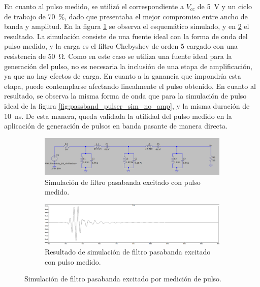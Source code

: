 En cuanto al pulso medido, se utilizó el correspondiente a $V_{cc}$ de
\qty{5}{\volt} y un ciclo de trabajo de \qty{70}{\percent}, dado que presentaba
el mejor compromiso entre ancho de banda y amplitud. En la figura
\ref{fig:passband_with_measurement} se observa el esquemático simulado, y en
\ref{fig:passband_with_measurement_result} el resultado. La simulación consiste
de una fuente ideal con la forma de onda del pulso medido, y la carga es el
filtro Chebyshev de orden 5 cargado con una resistencia de \qty{50}{\ohm}. Como
en este caso se utiliza una fuente ideal para la generación del pulso, no es
necesaria la inclusión de una etapa de amplificación, ya que no hay efectos de
carga. En cuanto a la ganancia que impondría esta etapa, puede contemplarse
afectando linealmente el pulso obtenido. En cuanto al resultado, se observa la
misma forma de onda que para la simulación de pulso ideal de la figura
\ref{fig:passband_pulser_sim_no_amp}, y la misma duración de
\qty{10}{\nano\second}. De esta manera, queda validada la utilidad del pulso
medido en la aplicación de generación de pulsos en banda pasante de manera
directa.

\begin{figure}[t]
    \centering
    \begin{subfigure}[b]{0.45\textwidth}
        \centering
        \includegraphics[width=\linewidth]{images/passband_with_measurement.png}
        \caption{Simulación de filtro pasabanda excitado con pulso medido.}
        \label{fig:passband_with_measurement}
    \end{subfigure}
    \hfill
    \begin{subfigure}[b]{0.45\textwidth}
        \centering
        \includegraphics[width=\linewidth]{images/passband_with_measurement_result.png}
        \caption{Resultado de simulación de filtro pasabanda excitado con pulso
        medido.}
        \label{fig:passband_with_measurement_result}
    \end{subfigure}
    \caption{Simulación de filtro pasabanda excitado por medición de pulso.}
    \label{fig:passband_measurement}
\end{figure}

